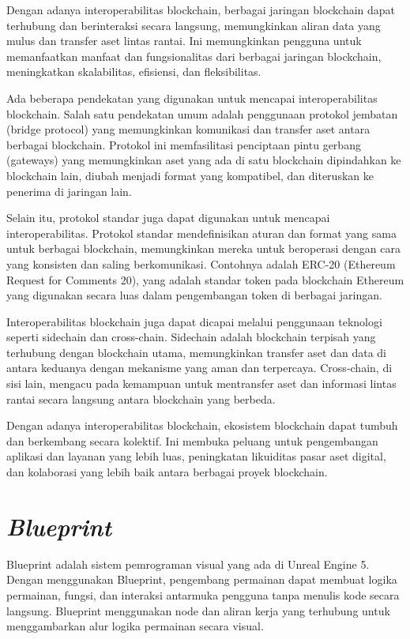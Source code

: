 Dengan adanya interoperabilitas blockchain, berbagai jaringan blockchain dapat terhubung dan berinteraksi secara langsung, memungkinkan aliran data yang mulus dan transfer aset lintas rantai. Ini memungkinkan pengguna untuk memanfaatkan
manfaat dan fungsionalitas dari berbagai jaringan blockchain, meningkatkan skalabilitas, efisiensi, dan fleksibilitas.

Ada beberapa pendekatan yang digunakan untuk mencapai interoperabilitas blockchain. Salah satu pendekatan umum adalah penggunaan protokol jembatan (bridge protocol) yang memungkinkan komunikasi dan transfer aset antara berbagai blockchain.
Protokol ini memfasilitasi penciptaan pintu gerbang (gateways) yang memungkinkan aset yang ada di satu blockchain dipindahkan ke blockchain lain, diubah menjadi format yang kompatibel, dan diteruskan ke penerima di jaringan lain. \parencite{swanson2016blockchain}

Selain itu, protokol standar juga dapat digunakan untuk mencapai interoperabilitas. Protokol standar mendefinisikan aturan dan format yang sama untuk berbagai blockchain, memungkinkan mereka untuk beroperasi dengan cara yang 
konsisten dan saling berkomunikasi. Contohnya adalah ERC-20 (Ethereum Request for Comments 20), yang adalah standar token pada blockchain Ethereum yang digunakan secara luas dalam pengembangan token di berbagai jaringan.

Interoperabilitas blockchain juga dapat dicapai melalui penggunaan teknologi seperti sidechain dan cross-chain. Sidechain adalah blockchain terpisah yang terhubung dengan blockchain utama, memungkinkan transfer aset dan data di antara 
keduanya dengan mekanisme yang aman dan terpercaya. Cross-chain, di sisi lain, mengacu pada kemampuan untuk mentransfer aset dan informasi lintas rantai secara langsung antara blockchain yang berbeda. \parencite{brunnhofer2019towards}

Dengan adanya interoperabilitas blockchain, ekosistem blockchain dapat tumbuh dan berkembang secara kolektif. Ini membuka peluang untuk pengembangan aplikasi dan layanan yang lebih luas, peningkatan likuiditas pasar aset digital, 
dan kolaborasi yang lebih baik antara berbagai proyek blockchain. \parencite{huang2021comprehensive}

\section{\emph{Blueprint}}
Blueprint adalah sistem pemrograman visual yang ada di Unreal Engine 5. Dengan menggunakan Blueprint, pengembang permainan dapat membuat logika permainan, fungsi, dan interaksi antarmuka pengguna tanpa menulis kode secara langsung. 
Blueprint menggunakan node dan aliran kerja yang terhubung untuk menggambarkan alur logika permainan secara visual.

